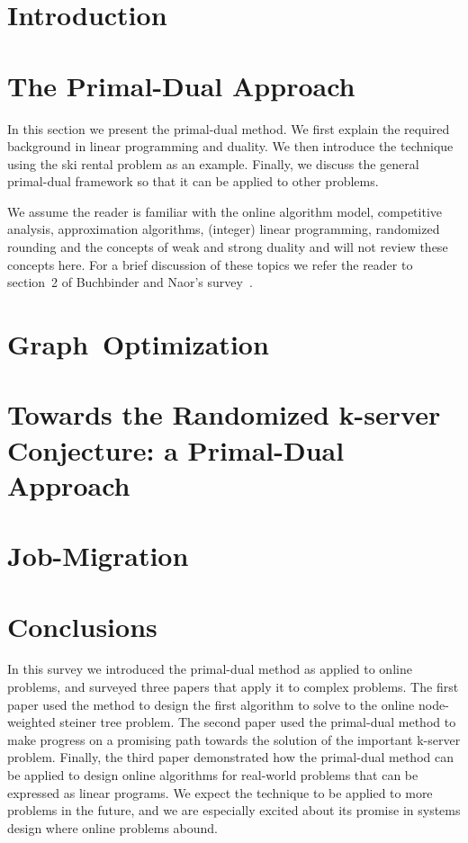 \section{Introduction}
\label{intro}




\section{The Primal-Dual Approach}
\label{primal-dual}

In this section we present the primal-dual method.
We first explain the required background in linear programming and duality.
We then introduce the technique using the ski rental problem as an example.
Finally, we discuss the general primal-dual framework so that it can be applied to other problems.

We assume the reader is familiar with the online algorithm model, competitive analysis, approximation algorithms, (integer) linear programming, randomized rounding and the concepts of weak and strong duality and will not review these concepts here.
For a brief discussion of these topics we refer the reader to section~2 of Buchbinder and Naor's survey~\cite{buchbinder09:survey}.





\section{\mbox{Graph Optimization}}
\label{steiner-tree}


\section{Towards the Randomized k-server Conjecture: a Primal-Dual Approach}
\label{k-server}


\section{Job-Migration}
\label{job-migration}


\section{Conclusions}
In this survey we introduced the primal-dual method as applied to online problems, and surveyed three papers that apply it to complex problems.
The first paper used the method to design the first algorithm to solve to the online node-weighted steiner tree problem.
The second paper used the primal-dual method to make progress on a promising path towards the solution of the important k-server problem.
Finally, the third paper demonstrated how the primal-dual method can be applied to design online algorithms for real-world problems that can be expressed as linear programs.
We expect the technique to be applied to more problems in the future, and we are especially excited about its promise in systems design where online problems abound.





